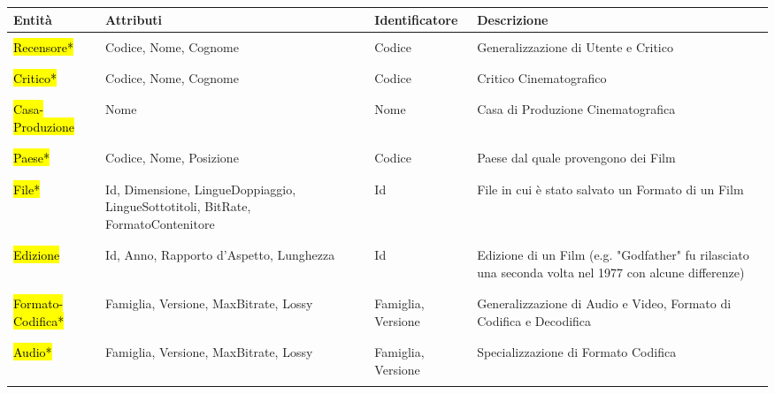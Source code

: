 \documentclass{article}
\begin{document}
\begin{tabular}{|C{1.9cm}|C{3.2cm}|C{2.3cm}|C{4cm}|}
\hline
 \textbf{Entità}& \textbf{Attributi}& \textbf{Identificatore}& \textbf{Descrizione}\\ 
\hline
\hline
& & & \\
 \hl{Recensore*} & Codice, Nome, Cognome & Codice & Generalizzazione di Utente e Critico \\
& & & \\
\hline
& & & \\
 \hl{Critico*} & Codice, Nome, Cognome & Codice & Critico Cinematografico \\
& & & \\
\hline
& & & \\
 \hl{Casa- Produzione} & Nome & Nome & Casa di Produzione Cinematografica \\
& & & \\
\hline
& & & \\
 \hl{Paese*} & Codice, Nome, Posizione & Codice & Paese dal quale provengono dei Film \\
& & & \\
\hline
& & & \\
 \hl{File*} & Id, Dimensione, LingueDoppiaggio, LingueSottotitoli, BitRate, FormatoContenitore & Id & File in cui è stato salvato un Formato di un Film \\ 
& & & \\
\hline
& & & \\
 \hl{Edizione} & Id, Anno, Rapporto d'Aspetto, Lunghezza & Id & Edizione di un Film (e.g. "Godfather" fu rilasciato una seconda volta nel 1977 con alcune differenze) \\ 
& & & \\
\hline 
& & & \\
 \hl{Formato- Codifica*} & Famiglia, Versione, MaxBitrate, Lossy & Famiglia, Versione & Generalizzazione di Audio e Video, Formato di Codifica e Decodifica \\
& & & \\
\hline 
& & & \\
 \hl{Audio*} & Famiglia, Versione, MaxBitrate, Lossy & Famiglia, Versione & Specializzazione di Formato Codifica\\ 
& & & \\
\hline 
\end{tabular}
%
%
%
%
%
%
\end{document}
